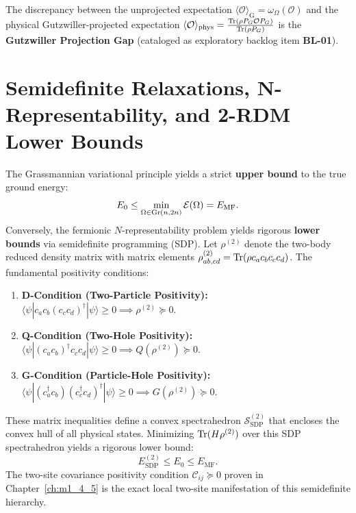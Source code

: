 The discrepancy between the unprojected expectation $\langle \mathcal{O} \rangle_{\mathrm{G}} = \omega_\Omega(\mathcal{O})$ and the physical Gutzwiller-projected expectation $\langle \mathcal{O} \rangle_{\mathrm{phys}} = \frac{\operatorname{Tr}(\rho P_G \mathcal{O} P_G)}{\operatorname{Tr}(\rho P_G)}$ is the \textbf{Gutzwiller Projection Gap} (cataloged as exploratory backlog item \textbf{BL-01}).

\section{Semidefinite Relaxations, N-Representability, and 2-RDM Lower Bounds}
\label{sec:m1_1b_sdp_bounds}
The Grassmannian variational principle yields a strict \textbf{upper bound} to the true ground energy:
\begin{equation}
\label{eq:m1_1b_upper_bound}
E_0 \le \min_{\Omega \in \operatorname{Gr}(n, 2n)} \mathcal{E}(\Omega) = E_{\mathrm{MF}}.
\end{equation}
Conversely, the fermionic $N$-representability problem yields rigorous \textbf{lower bounds} via semidefinite programming (SDP). Let $\rho^{(2)}$ denote the two-body reduced density matrix with matrix elements $\rho^{(2)}_{ab,cd} = \operatorname{Tr}(\rho c_a c_b c_c c_d)$. The fundamental positivity conditions:
\begin{enumerate}
    \item \textbf{D-Condition (Two-Particle Positivity):} $\langle \psi | c_a c_b (c_c c_d)^\dagger | \psi \rangle \ge 0 \implies \rho^{(2)} \succeq 0$.
    \item \textbf{Q-Condition (Two-Hole Positivity):} $\langle \psi | (c_a c_b)^\dagger c_c c_d | \psi \rangle \ge 0 \implies Q(\rho^{(2)}) \succeq 0$.
    \item \textbf{G-Condition (Particle-Hole Positivity):} $\langle \psi | (c_a^\dagger c_b)(c_c^\dagger c_d)^\dagger | \psi \rangle \ge 0 \implies G(\rho^{(2)}) \succeq 0$.
\end{enumerate}
These matrix inequalities define a convex spectrahedron $\mathcal{S}_{\mathrm{SDP}}^{(2)}$ that encloses the convex hull of all physical states. Minimizing $\operatorname{Tr}(H \rho^{(2)})$ over this SDP spectrahedron yields a rigorous lower bound:
\begin{equation}
\label{eq:m1_1b_energy_sandwich}
E_{\mathrm{SDP}}^{(2)} \le E_0 \le E_{\mathrm{MF}}.
\end{equation}
The two-site covariance positivity condition $\mathcal{C}_{ij} \succeq 0$ proven in Chapter~\ref{ch:m1_4_5} is the exact local two-site manifestation of this semidefinite hierarchy.


